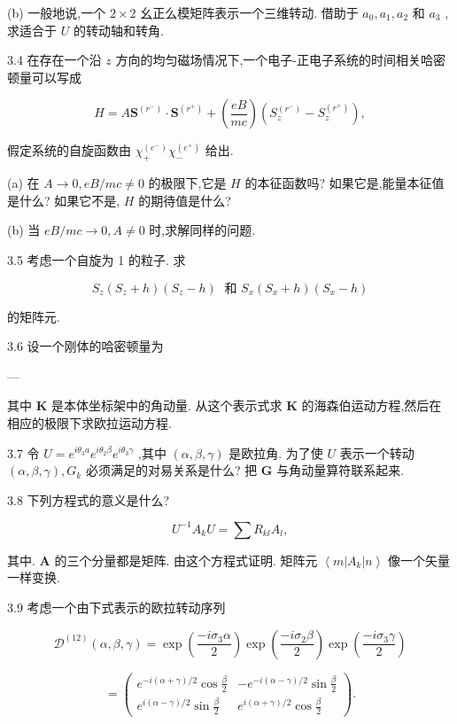 (b) 一般地说,一个 $2 \times 2$ 幺正么模矩阵表示一个三维转动. 借助于 ${a}_{0},{a}_{1},{a}_{2}$ 和 ${a}_{3}$ ,求适合于 $U$ 的转动轴和转角.

3.4 在存在一个沿 $z$ 方向的均匀磁场情况下,一个电子-正电子系统的时间相关哈密顿量可以写成

$$
H = A{\mathbf{S}}^{\left( {r}^{ - }\right) } \cdot {\mathbf{S}}^{\left( {r}^{ + }\right) } + \left( \frac{eB}{mc}\right) \left( {{S}_{z}^{\left( {r}^{ - }\right) } - {S}_{z}^{\left( {r}^{ + }\right) }}\right) ,
$$

假定系统的自旋函数由 ${\chi }_{ + }^{\left( {e}^{ - }\right) }{\chi }_{ - }^{\left( {e}^{ + }\right) }$ 给出.

(a) 在 $A \rightarrow 0,{eB}/{mc} \neq 0$ 的极限下,它是 $H$ 的本征函数吗? 如果它是,能量本征值是什么? 如果它不是, $H$ 的期待值是什么?

(b) 当 ${eB}/{mc} \rightarrow 0, A \neq 0$ 时,求解同样的问题.

3.5 考虑一个自旋为 1 的粒子. 求

$$
{S}_{z}\left( {{S}_{z} + h}\right) \left( {{S}_{z} - h}\right) \;\text{ 和 }{S}_{x}\left( {{S}_{x} + h}\right) \left( {{S}_{x} - h}\right)
$$

的矩阵元.

3.6 设一个刚体的哈密顿量为

---

其中 $\mathbf{K}$ 是本体坐标架中的角动量. 从这个表示式求 $\mathbf{K}$ 的海森伯运动方程,然后在相应的极限下求欧拉运动方程.

3.7 令 $U = {e}^{i{\theta }_{3}a}{e}^{i{\theta }_{2}\beta }{e}^{i{\theta }_{3}\gamma }$ ,其中 $\left( {\alpha ,\beta ,\gamma }\right)$ 是欧拉角. 为了使 $U$ 表示一个转动 $\left( {\alpha ,\beta ,\gamma }\right) ,{G}_{k}$ 必须满足的对易关系是什么? 把 $\mathbf{G}$ 与角动量算符联系起来.

3.8 下列方程式的意义是什么?

$$
{U}^{-1}{A}_{k}U = \sum {R}_{kl}{A}_{l},
$$

其中. $\mathbf{A}$ 的三个分量都是矩阵. 由这个方程式证明. 矩阵元 $\left\langle {m\left| {A}_{k}\right| n}\right\rangle$ 像一个矢量一样变换.

3.9 考虑一个由下式表示的欧拉转动序列

$$
{\mathcal{D}}^{\left( 12\right) }\left( {\alpha ,\beta ,\gamma }\right) = \exp \left( \frac{-i{\sigma }_{3}\alpha }{2}\right) \exp \left( \frac{-i{\sigma }_{2}\beta }{2}\right) \exp \left( \frac{-i{\sigma }_{3}\gamma }{2}\right)
$$

$$
= \left( \begin{matrix} {e}^{-i\left( {\alpha + \gamma }\right) /2}\cos \frac{\beta }{2} & - {e}^{-i\left( {\alpha - \gamma }\right) /2}\sin \frac{\beta }{2} \\ {e}^{i\left( {\alpha - \gamma }\right) /2}\sin \frac{\beta }{2} & {e}^{i\left( {\alpha + \gamma }\right) /2}\cos \frac{\beta }{2} \end{matrix}\right) .
$$

